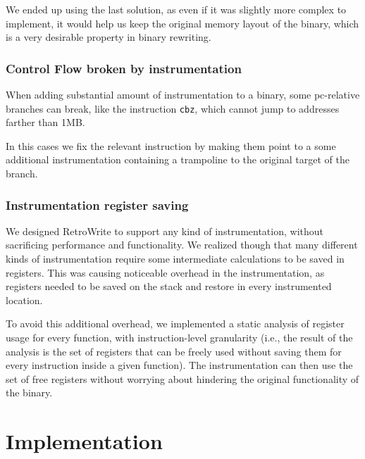 \documentclass[a4paper,11pt,oneside]{report}
\newcommand{\sysname}{RetroWrite\xspace}
\begin{document}
We ended up using the last solution, as even if it was slightly more complex to 
implement, it would help us keep the original memory layout of the binary, 
which is a very desirable property in binary rewriting. 

\subsection{Control Flow broken by instrumentation}
When adding substantial amount of instrumentation to a binary, some pc-relative 
branches can break, like the instruction \texttt{cbz}, which cannot jump to 
addresses farther than 1MB. 

In this cases we fix the relevant instruction by making them point to a some 
additional instrumentation containing a trampoline to the original target of 
the branch. 




\subsection{Instrumentation register saving}

We designed \sysname to support any kind of instrumentation, without 
sacrificing performance and functionality. We realized though that many 
different kinds of instrumentation require some intermediate calculations to be 
saved in registers. This was causing noticeable overhead in the 
instrumentation, as registers needed to be saved on the stack and restore in 
every instrumented location. 

To avoid this additional overhead, we implemented a static analysis of register 
usage for every function, with instruction-level granularity (i.e., the result 
of the analysis is the set of registers that can be freely used without saving 
them for every instruction inside a given function). The instrumentation can 
then use the set of free registers without worrying about hindering the 
original functionality of the binary. 



\chapter{Implementation}
\end{document}

